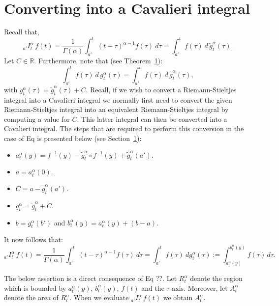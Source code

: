 \documentclass[twoside,reqno,11pt]{fcaa-var} %
\begin{document}
\section{Converting into a Cavalieri integral}
Recall that,
\begin{equation}
_{a'}I_t^{\alpha}\,f(t) = \frac{1}{\Gamma(\alpha)}\int_{a'}^{t}(t-\tau)^{\alpha-1}f(\tau)~d\tau = \int_{a'}^{t} f(\tau)~d\,\widetilde{g}_t^{\alpha}(\tau). 
\end{equation}
Let $C\in\mathbb{R}$. Furthermore, note that (see Theorem~\ref{}):
\begin{equation}
\int_{a'}^{t} f(\tau)~d\,g_t^{\alpha}(\tau) = \int_{a'}^{t} f(\tau)~d\,\widetilde{g}_t^{\alpha}(\tau),  
\end{equation}
with $g_t^{\alpha}(\tau) = \widetilde{g}_t^{\alpha}(\tau) + C$. 
Recall, if we wish to convert a Riemann-Stieltjes integral into a Cavalieri integral we normally first need to convert the given Riemann-Stieltjes integral into an equivalent 
Riemann-Stieltjes integral by computing a value for $C$. This latter integral can then be converted into a Cavalieri integral. The steps that are required to perform this conversion in the case of Eq is presented below (see Section~\ref{}):
\begin{itemize}
 \item $a_t^{\alpha}(y) = f^{-1}(y) - \widetilde{g}_t^{\alpha}\circ f^{-1}(y)+ \widetilde{g}_t^{\alpha}(a')$.
 \item $a = a_t^{\alpha}(0)$.
 \item $C = a - \widetilde{g}_t^{\alpha}(a')$.
 \item $g_t^{\alpha} = \widetilde{g}_t^{\alpha} + C$.
 \item $b = g_t^{\alpha}(b')$ and $b_t^{\alpha}(y) = a_t^{\alpha}(y) + (b-a)$.
\end{itemize}
It now follows that:
\begin{equation}
_{a'}I_t^{\alpha}\,f(t) =  \frac{1}{\Gamma(\alpha)}\int_{a'}^{t}(t-\tau)^{\alpha-1}f(\tau)~d\tau= \int_{a'}^{t} f(\tau)~dg_t^{\alpha}(\tau) := \int_{a_t^{\alpha}(y)}^{b_t^{\alpha}(y)} f(\tau)\,d\tau.
\end{equation}

The below assertion is a direct consequence of Eq ??. Let $R_t^{\alpha}$ denote the region which is bounded by $a_t^{\alpha}(y)$, $b_t^{\alpha}(y)$, $f(t)$ and the $\tau$-axis. Moreover, let $A_{t}^{\alpha}$ denote the area of $R_t^{\alpha}$. When we evaluate $_{a'}I_t^{\alpha}\,f(t)$ we obtain $A_{t}^{\alpha}$. 
\end{document}
